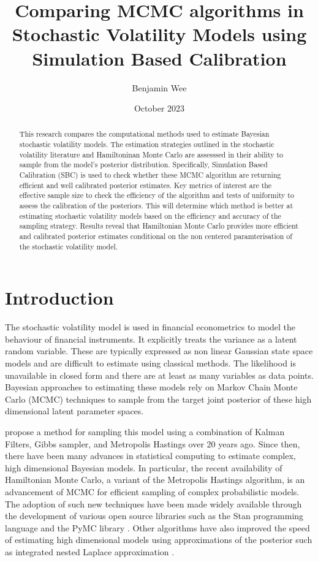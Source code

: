 \documentclass[12pt, a4paper]{article}
\title{Comparing MCMC algorithms in Stochastic Volatility Models using Simulation Based Calibration}
\author{Benjamin Wee}
\date{October 2023}
\begin{document}
\maketitle 

\begin{abstract}
    This research compares the computational methods used to estimate Bayesian stochastic volatility models. The estimation strategies outlined in the stochastic volatility literature and Hamiltoninan Monte Carlo are assesssed in their ability to sample from the model's posterior distribution. Specifically, Simulation Based Calibration (SBC) is used to check whether these MCMC algorithm are returning efficient and well calibrated posterior estimates. Key metrics of interest are the effective sample size to check the efficiency of the algorithm and tests of uniformity to assess the calibration of the posteriors. This will determine which method is better at estimating stochastic volatility models based on the efficiency and accuracy of the sampling strategy. Results reveal that Hamiltonian Monte Carlo provides more efficient and calibrated posterior estimates conditional on the non centered paramterisation of the stochastic volatility model. 
\end{abstract}

\newpage

\tableofcontents{\protect\newpage}

\section{Introduction}
    The stochastic volatility model is used in financial econometrics to model the behaviour of financial instruments. It explicitly treats the variance as a latent random variable. These are typically expressed as non linear Gaussian state space models and are difficult to estimate using classical methods. The likelihood is unavailable in closed form and there are at least as many variables as data points. Bayesian approaches to estimating these models rely on  Markov Chain Monte Carlo (MCMC) techniques to sample from the target joint posterior of these high dimensional latent parameter spaces. 

    \citet{kim1998stochastic} propose a method for sampling this model using a combination of Kalman Filters, Gibbs sampler, and Metropolis Hastings over 20 years ago.  Since then, there have been many advances in statistical computing to estimate complex, high dimensional Bayesian models. In particular, the recent availability of Hamiltonian Monte Carlo, a variant of the Metropolis Hastings algorithm, is an advancement of MCMC for efficient sampling of complex probabilistic models. The adoption of such new techniques have been made widely available through the development of various open source libraries such as the Stan programming language \citep{stan} and the PyMC library \citep{pymc2023}. Other algorithms have also improved the speed of estimating high dimensional models using approximations of the posterior such as integrated nested Laplace approximation \citep{rue2009approximate}.
\end{document}

